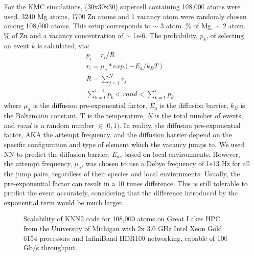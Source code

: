 For the \ac{KMC} simulations, (30x30x30) supercell containing 108,000 atoms were used. 3240 Mg atoms, 1700 Zn atoms and 1 vacancy atom were randomly chosen among 108,000 atoms. This setup corresponds to $\sim$ 3 atom. \% of Mg, $\sim$ 2 atom. \% of Zn and a vacancy concentration of $\sim$ 1e-6. The probability, $p_k$, of selecting an event $k$ is calculated, via:
\begin{subequations}
\begin{align}
& p_i = r_i / R    \label{Chap:Al/Vac:eq:prob} \\
& r_i = \mu_a * exp(- E_a / k_B T)  \label{Chap:Al/Vac:eq:rate} \\
& R = \sum_{j=1}^N r_j \label{Chap:Al/Vac:eq:R} \\
& \sum_{k=1}^{i-1} p_k < rand < \sum_{k=1}^{i} p_k \label{Chap:Al/Vac:eq:choice}
\end{align}
\end{subequations}
where $\mu_a$ is the diffusion pre-exponential factor, $E_a$ is the diffusion barrier, $k_B$ is the Boltzmann constant, T is the temperature, $N$ is the total number of events, and $rand$ is a random number $\in [0, 1)$. In reality, the diffusion pre-exponential factor, AKA the attempt frequency, and the diffusion barrier depend on the specific configuration \cite{osti_323431,van2001first,le2002kinetic} and type of element which the vacancy jumps to\cite{clouet2004nucleation}. We used \ac{NN} to predict the diffusion barrier, $E_a$, based on local environments. However, the attempt frequency, $\mu_a$, was chosen to use a Debye frequency of 1e13 Hz for all the jump pairs, regardless of their species and local environments. Usually, the pre-exponential factor can result in a 10 times difference. This is still tolerable to predict the event accurately, considering that the difference introduced by the exponential term would be much larger.


\begingroup
\begin{figure}[!ht]
  \centering
\caption[Scalability of KNN2 code on Great Lakes HPC.]{Scalability of KNN2 code for 108,000 atoms on Great Lakes HPC from the University of Michigan with 2x 3.0 GHz Intel Xeon Gold 6154 processors and InfiniBand HDR100 networking, capable of 100 Gb/s throughput.}
\label{Chap:Al/Vac:fig:scale}
\end{figure}
\endgroup


